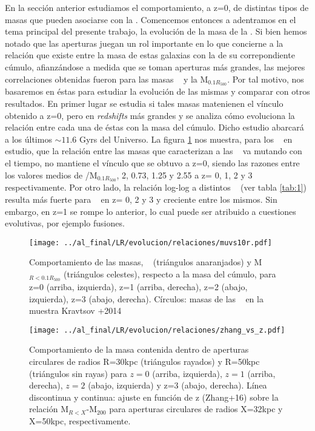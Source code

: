 En la secci\'on anterior estudiamos el comportamiento, a z=0,
de distintas tipos de masas que pueden asociarse con la \bcg.
Comencemos entonces a 
adentramos en el tema principal del presente trabajo, la evoluci\'on
de la masa de la \bcg. Si bien hemos notado que las aperturas juegan un 
rol importante en lo que concierne a la relaci\'on que existe entre la
masa de estas galaxias con la de su correpondiente c\'umulo, afianz\'andose 
a medida que se toman aperturas m\'as grandes, 
las mejores correlaciones obtenidas fueron para las masas \mvc~ y la M$_{0.1R_{500}}$.
Por tal motivo, nos basaremos en \'estas para estudiar la evoluci\'on de las mismas y comparar con otros
resultados. 
En primer lugar se estudia si tales masas matenienen el v\'inculo
obtenido a z=0, pero en \textit{redshifts} m\'as grandes y se analiza c\'omo evoluciona la relaci\'on
entre cada una de \'estas con la masa del c\'umulo. Dicho estudio abarcar\'a
a los \'ultimos $\sim11.6$ Gyrs del Universo. La figura \ref{fig:mbcgm10} nos muestra,
para los \z~ en estudio, que la relaci\'on entre las masas que caracterizan
a las \bcgs~ va mutando con el tiempo, no mantiene el v\'inculo que se obtuvo a z=0, siendo
las razones entre los valores medios de \mvc/M$_{0.1R_{500}}$,  2, 0.73, 1.25 y 2.55 a z= 0, 1, 2 y 3 respectivamente.
Por otro lado, la relaci\'on log-log a distintos \z~ (ver tabla \ref{tab:1}) resulta
m\'as fuerte para \mvc~ en z= 0, 2 y 3 y creciente entre los mismos. Sin embargo, 
en z=1 se rompe lo anterior, lo cual puede ser atribuido a cuestiones evolutivas, por ejemplo fusiones.


\begin{figure}[H]
\centering
\hspace*{-1.5cm}
 \texttt{[image: ../al\_final/LR/evolucion/relaciones/muvs10r.pdf]}
\caption{Comportamiento de las masas, \mvc~ (tri\'angulos anaranjados) y M$_{R<0.1R_{500}}$ 
(tri\'angulos celestes), respecto a la masa del c\'umulo, para z=0 (arriba, izquierda),
z=1 (arriba, derecha), z=2 (abajo, izquierda), z=3 (abajo, derecha). C\'irculos:  masas de las \bcgs~ en la muestra 
Kravtsov +2014}
\label{fig:mbcgm10}
\end{figure}

\begin{figure}[H]
\centering
\hspace*{-1cm}
 \texttt{[image: ../al\_final/LR/evolucion/relaciones/zhang\_vs\_z.pdf]}
\caption{Comportamiento de la masa contenida dentro de aperturas circulares de radios R=30kpc (tri\'angulos rayados) y
R=50kpc (tri\'angulos sin rayas) para $z=0$ (arriba, izquierda), $z=1$ (arriba, derecha), $z=2$ (abajo, izquierda) y z=3 (abajo, derecha).
L\'inea discontinua y continua: ajuste en funci\'on de z (Zhang+16) sobre la relaci\'on M$_{R<X}$-M$_{200}$ para aperturas circulares de radios X=32kpc y X=50kpc, respectivamente. 
}
\label{fig:zhang}
\end{figure}

